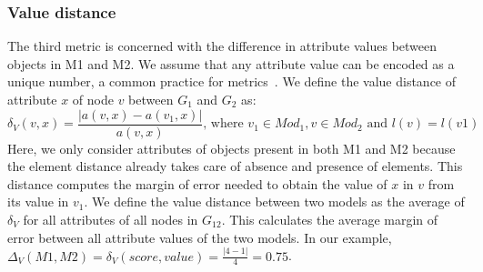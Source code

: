 \subsubsection{Value distance}
The third metric is concerned with the difference in attribute values between objects in M1 and M2.
We assume that any attribute value can be encoded as a unique number, a common practice for metrics~\cite{Bertoa2018}.
We define the value distance of attribute $x$ of node $v$ between $G_1$ and $G_2$ as:
\[
\delta_V(v,x)=\frac{|a(v,x)-a(v_1,x)|}{a(v,x)} \mbox{, where } v_1 \in Mod_1, v \in Mod_2 \mbox{ and } l(v)=l(v1)
\]
Here, we only consider attributes of objects present in both M1 and M2 because the element distance already takes care of absence and presence of elements.
This distance computes the margin of error needed to obtain the value of $x$ in $v$ from its value in $v_1$.
We define the value distance between two models as the average of $\delta_V$ for all attributes of all nodes in $G_{12}$.
This calculates the average margin of error between all attribute values of the two models.
In our example, $\Delta_V(M1,M2)=\delta_V(score,value)=\frac{|4-1|}{4}=0.75$.


